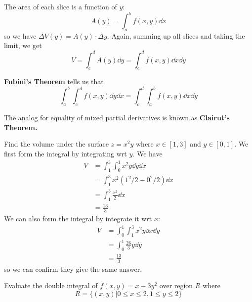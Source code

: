 \begin{itemize}
          The area of each slice is a function of $y$:
          \begin{equation}
              A(y) = \int_a^b f(x,y)\dd{x}
          \end{equation}
          so we have $\Delta V(y) = A(y) \cdot \Delta y$. Again, summing up all slices and taking the limit, we get
          \begin{equation}
              V = \int_c^d A(y) \dd{y} = \int_c^d f(x,y) \dd{x}\dd{y}
          \end{equation}
          \begin{theorem}
              \textbf{Fubini's Theorem} tells us that
              \begin{equation}
                  \int_a^b \int_c^d f(x,y) \dd{y}\dd{x} = \int_c^d \int_a^b f(x,y)\dd{x}\dd{y}
              \end{equation}
          \end{theorem}
          The analog for equality of mixed partial derivatives is known as \textbf{Clairut's Theorem.}
          \begin{example}
              Find the volume under the surface $z=x^2y$ where $x\in [1,3]$ and $y\in [0,1]$. We first form the integral by integrating wrt $y$.  We have
              \begin{align}
                  V & = \int_1^3 \int_0^1 x^2y \dd{y}\dd{x} \\
                    & = \int_1^3 x^2(1^2/2 - 0^2/2)\dd{x}   \\
                    & = \int_1^3 \frac{x^2}{2}\dd{x}        \\
                    & = \frac{13}{3}
              \end{align}
              We can also form the integral by integrate it wrt $x$:
              \begin{align}
                  V & = \int_0^1 \int_1^3 x^2y\dd{x}\dd{y} \\
                    & = \int_0^1 \frac{26}{3}y \dd{y}      \\
                    & = \frac{13}{3}
              \end{align}
              so we can confirm they give the same answer.
          \end{example}
          \begin{example}
              Evaluate the double integral of $f(x,y) = x-3y^2$ over region $R$ where
              \begin{equation}
                  R = \{(x,y)|0\le x\le 2, 1\le y\le 2\}

\end{equation}
\end{example}
\end{itemize}
